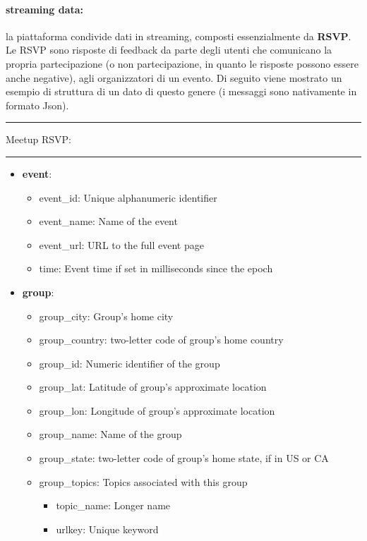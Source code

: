 \documentclass[fleqn,10pt]{SelfArx} %
\begin{document}
{\paragraph{streaming data:} 
la piattaforma condivide dati in streaming, composti essenzialmente da \textbf{RSVP}.
Le RSVP sono risposte di feedback da parte degli utenti che comunicano la propria partecipazione (o non partecipazione, in quanto le risposte possono essere anche negative), agli organizzatori di un evento.
Di seguito viene mostrato un esempio di struttura di un dato di questo genere (i messaggi sono nativamente in formato Json).%
\newpage
\hrule
\vspace*{0.1cm}
Meetup RSVP:
\vspace*{0.05cm}
\hrule
\begin{itemize}[noitemsep]
\item \textbf{event}:
	\begin{itemize}[noitemsep]
	\item event\_id:	Unique alphanumeric identifier
	\item event\_name: Name of the event
	\item event\_url: URL to the full event page
	\item time: Event time if set in milliseconds since the epoch
	\end{itemize}
\item \textbf{group}:
	\begin{itemize}[noitemsep]
    \item group\_city: Group's home city
    \item group\_country: two-letter code of group's home country
    \item group\_id: Numeric identifier of the group
    \item group\_lat: Latitude of group's approximate location
    \item group\_lon: Longitude of group's approximate location
    \item group\_name: Name of the group
    \item group\_state: two-letter code of group's home state, if in US or CA
    \item group\_topics: Topics associated with this group
			\begin{itemize}[noitemsep]
			\item topic\_name: Longer name
        	\item urlkey: Unique keyword
			\end{itemize}

\end{itemize}
\end{itemize}}
\end{document}
